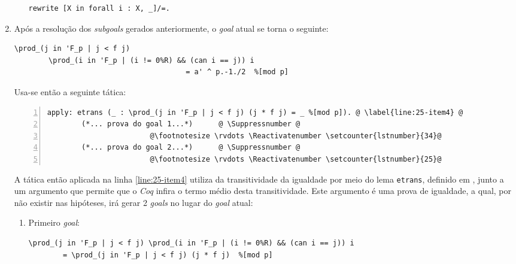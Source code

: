 \begin{enumerate}[label=\textbf{\roman*.}]
\begin{enumerate}[listparindent=\parindent]
                        \begin{lstlisting}[language=coq,frame=single,tabsize=1]
rewrite [X in forall i : X, _]/=.
                        \end{lstlisting}

        \end{enumerate}

        \item Após a resolução dos \textit{subgoals} gerados anteriormente, o \textit{goal} atual se torna o seguinte:
                \begin{lstlisting}[language=coq,frame=single,tabsize=1]
\prod_(j in 'F_p | j < f j) 
        \prod_(i in 'F_p | (i != 0%R) && (can i == j)) i
                                        = a' ^ p.-1./2  %[mod p]
                \end{lstlisting}
        Usa-se então a seguinte tática:

                \begin{lstlisting}[language=coq,frame=single, numbers=left,stepnumber=1,tabsize=1,name=proof, escapechar=\@]
apply: etrans (_ : \prod_(j in 'F_p | j < f j) (j * f j) = _ %[mod p]). @ \label{line:25-item4} @
        (*... prova do goal 1...*)      @ \Suppressnumber @
                        @\footnotesize \rvdots \Reactivatenumber \setcounter{lstnumber}{34}@
        (*... prova do goal 2...*)      @ \Suppressnumber @
                        @\footnotesize \rvdots \Reactivatenumber \setcounter{lstnumber}{25}@
                \end{lstlisting}
        A tática então aplicada na linha \ref{line:25-item4} utiliza da transitividade da igualdade por meio do lema \lstinline[language=coq]|etrans|, definido em \cite{coqteam2022manual}, junto a um argumento que permite que o \textit{Coq} infira o termo médio desta transitividade. Este argumento é uma prova de igualdade, a qual, por não existir nas hipóteses, irá gerar 2 \textit{goals} no lugar do \textit{goal} atual:

        \begin{enumerate}[label=\textbf{\roman{enumi}.(\alph*)}]
                \item Primeiro \textit{goal}:
                
                        \begin{lstlisting}[language=coq,frame=single,tabsize=1]
\prod_(j in 'F_p | j < f j) \prod_(i in 'F_p | (i != 0%R) && (can i == j)) i
        = \prod_(j in 'F_p | j < f j) (j * f j)  %[mod p]
                        \end{lstlisting}
                

\end{enumerate}
\end{enumerate}
